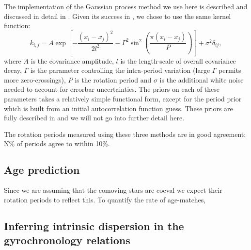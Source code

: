 
The implementation of the Gaussian process method we use here is described and
discussed in detail in \citet{Angus2017}.
Given its success in \citet{Angus2017}, we chose to use the same kernel
function:
\begin{equation}
\label{eq:QP}
k_{i,j} = A \exp \left[-\frac{(x_i - x_j)^2}{2l^2} -
    \Gamma^2 \sin^2\left(\frac{\pi(x_i - x_j)}{P}\right) \right] + \sigma^2
    \delta_{ij},
\end{equation}
where $A$ is the covariance amplitude, $l$ is the length-scale of overall
covariance decay, $\Gamma$ is the parameter controlling
the intra-period variation (large $\Gamma$ permits more zero-crossings), $P$
is the rotation period and $\sigma$ is the additional white noise needed to
account for errorbar uncertainties.
The priors on each of these parameters takes a relatively simple functional
form, except for the period prior which is built from an initial
autocorrelation function guess.
These priors are fully described in \citet{Angus2017} and we will not go into
further detail here.

The rotation periods measured using these three methods are in good agreement:
N\% of periods agree to within 10\%.

\subsection{Age prediction}

Since we are assuming that the comoving stars are coeval we expect their
rotation periods to reflect this.
To quantify the rate of age-matches,

\subsection{Inferring intrinsic dispersion in the gyrochronology
relations}

